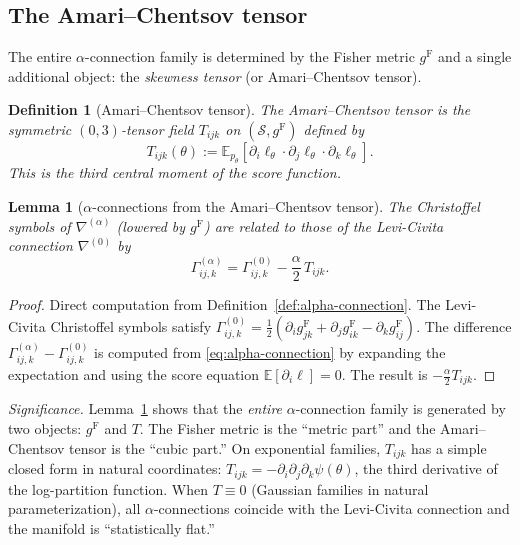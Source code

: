 \documentclass[11pt]{article}
\newcommand{\E}{\mathbb{E}}
\newcommand{\gF}{g^{\mathrm{F}}}
\newtheorem{definition}{Definition}
\newtheorem{lemma}{Lemma}
\theoremstyle{remark}
\begin{document}
\subsection{The Amari--Chentsov tensor}

The entire $\alpha$-connection family is determined by the Fisher metric $\gF$
and a single additional object: the \emph{skewness tensor} (or
Amari--Chentsov tensor).

\begin{definition}[Amari--Chentsov tensor]\label{def:ac-tensor}
The \emph{Amari--Chentsov tensor} is the symmetric $(0,3)$-tensor field
$T_{ijk}$ on $(\mathcal{S}, \gF)$ defined by
\begin{equation}\label{eq:ac-tensor}
T_{ijk}(\theta) := \E_{p_\theta}\!\left[
\partial_i \ell_\theta \cdot \partial_j \ell_\theta \cdot
\partial_k \ell_\theta\right].
\end{equation}
This is the third central moment of the score function.
\end{definition}

\begin{lemma}[$\alpha$-connections from the Amari--Chentsov tensor]
\label{lem:alpha-from-ac}
The Christoffel symbols of $\nabla^{(\alpha)}$ (lowered by $\gF$) are related
to those of the Levi-Civita connection $\nabla^{(0)}$ by
\begin{equation}\label{eq:alpha-from-ac}
\Gamma^{(\alpha)}_{ij,k}
= \Gamma^{(0)}_{ij,k} - \frac{\alpha}{2}\, T_{ijk}.
\end{equation}
\end{lemma}

\begin{proof}
Direct computation from Definition~\ref{def:alpha-connection}.  The
Levi-Civita Christoffel symbols satisfy
$\Gamma^{(0)}_{ij,k} = \frac{1}{2}(\partial_i \gF_{jk} + \partial_j \gF_{ik}
- \partial_k \gF_{ij})$.  The difference
$\Gamma^{(\alpha)}_{ij,k} - \Gamma^{(0)}_{ij,k}$ is computed from
\eqref{eq:alpha-connection} by expanding the expectation and using the score
equation $\E[\partial_i \ell] = 0$.  The result is
$-\frac{\alpha}{2} T_{ijk}$.
\end{proof}

\noindent\emph{Significance.}  Lemma~\ref{lem:alpha-from-ac} shows that the
\emph{entire} $\alpha$-connection family is generated by two objects:
$\gF$ and $T$.  The Fisher metric is the ``metric part'' and the
Amari--Chentsov tensor is the ``cubic part.''  On exponential families,
$T_{ijk}$ has a simple closed form in natural coordinates:
$T_{ijk} = -\partial_i \partial_j \partial_k \psi(\theta)$, the third
derivative of the log-partition function.  When $T \equiv 0$ (Gaussian
families in natural parameterization), all $\alpha$-connections coincide with
the Levi-Civita connection and the manifold is ``statistically flat.''
\end{document}
